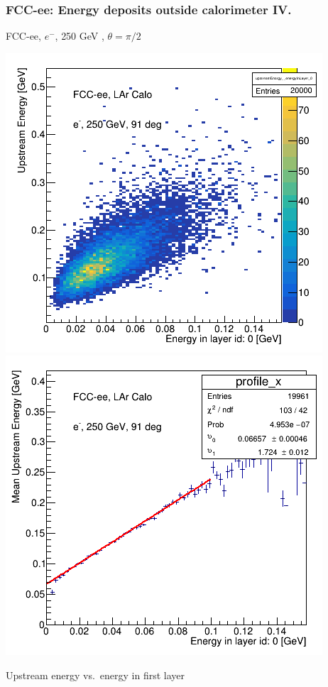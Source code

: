 \documentclass{beamer}
\newcommand{\redtext}[1]{%
  \textcolor{myRed}{#1}
}
\begin{document}
\begin{frame}
  \frametitle{FCC-ee: Energy deposits outside calorimeter IV.}

  \centering
  FCC-ee, $e^{-}$, \redtext{250 GeV}, $\theta = \pi/2$ \\[1.5ex]
  \begin{adjustwidth}{-9mm}{-9mm}
    \includegraphics[width=0.49\linewidth]{figures/12layers/hist_upstream_vs_layer_0_91deg_250GeV.png}
    \includegraphics[width=0.49\linewidth]{figures/12layers/profile_upstream_vs_layer_0_91deg_250GeV.png}
  \end{adjustwidth}
  \redtext{Upstream} energy vs.\ energy in first layer
\end{frame}
\end{document}
